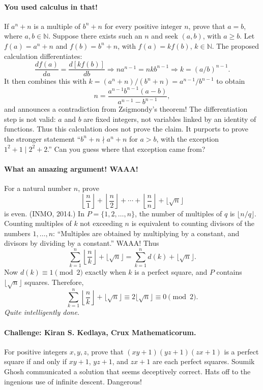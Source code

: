 \documentclass[11pt,a4paper]{article}
\begin{document}
\paragraph{You used calculus in that!}
If $a^n+n$ is a multiple of $b^n+n$ for every positive integer $n$, prove
that $a=b$, where $a,b\in\mathbb N$.
Suppose there exists such an $n$ and seek $(a,b)$, with $a\geq b$.
Let $f(a)=a^n+n$ and $f(b)=b^n+n$, with $f(a)=kf(b)$,
$k\in\mathbb N$.
The proposed calculation differentiates:
\[
\frac{df(a)}{da}=\frac{d[kf(b)]}{db}
\Longrightarrow na^{n-1}=nkb^{n-1}
\Longrightarrow k=(a/b)^{n-1}.
\]
It then combines this with
$k=(a^n+n)/(b^n+n)=a^{n-1}/b^{n-1}$ to obtain
\[
n=\frac{a^{n-1}b^{n-1}(a-b)}{a^{n-1}-b^{n-1}},
\]
and announces a contradiction from Zsigmondy's theorem!
The differentiation step is not valid: $a$ and $b$ are fixed integers, not
variables linked by an identity of functions. Thus this calculation does not
prove the claim.
It purports to prove the stronger statement
``$b^n+n\nmid a^n+n$ for $a>b$, with the exception
$1^2+1\mid2^2+2$.'' Can you guess where that exception came from?

\paragraph{What an amazing argument! WAAA!}
For a natural number $n$, prove
\[
\left\lfloor\frac n1\right\rfloor+
\left\lfloor\frac n2\right\rfloor+\cdots+
\left\lfloor\frac nn\right\rfloor+\lfloor\sqrt n\rfloor
\]
is even. (INMO, 2014.)
In $P=\{1,2,\ldots,n\}$, the number of multiples of $q$ is
$\lfloor n/q\rfloor$.
Counting multiples of $k$ not exceeding $n$ is equivalent to counting divisors
of the numbers $1,\ldots,n$:
``Multiples are obtained by multiplying by a constant, and divisors by dividing
by a constant.'' WAAA!
Thus
\[
\sum_{k=1}^n\left\lfloor\frac nk\right\rfloor+\lfloor\sqrt n\rfloor
=\sum_{k=1}^n d(k)+\lfloor\sqrt n\rfloor.
\]
Now $d(k)\equiv1\pmod2$ exactly when $k$ is a perfect square, and $P$
contains $\lfloor\sqrt n\rfloor$ squares. Therefore,
\[
\sum_{k=1}^n\left\lfloor\frac nk\right\rfloor+\lfloor\sqrt n\rfloor
\equiv2\lfloor\sqrt n\rfloor\equiv0\pmod2.
\]
\emph{Quite intelligently done.}



\paragraph{Challenge: Kiran S. Kedlaya, Crux Mathematicorum.}
For positive integers $x,y,z$, prove that $(xy+1)(yz+1)(zx+1)$ is a perfect square
if and only if $xy+1$, $yz+1$, and $zx+1$ are each perfect squares.
Soumik Ghosh communicated a solution that seems deceptively correct.
Hats off to the ingenious use of infinite descent. Dangerous!
\end{document}
